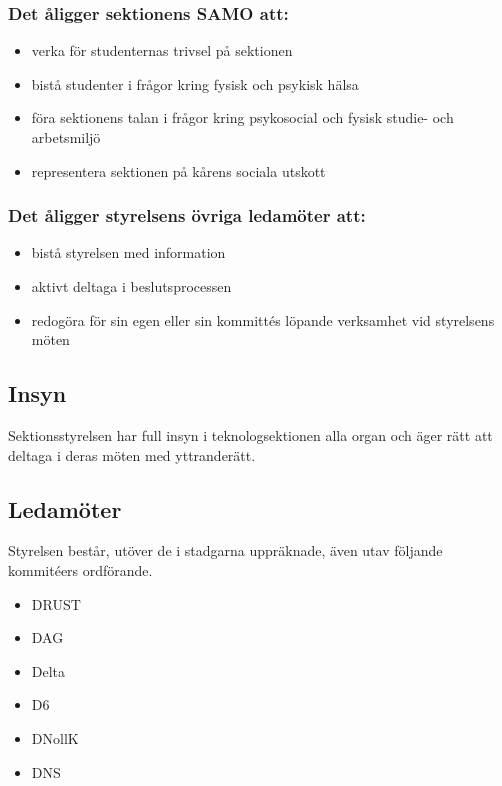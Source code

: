 \subsubsection{Det åligger sektionens SAMO att:}

\begin{itemize}
    \item verka för studenternas trivsel på sektionen
    \item bistå studenter i frågor kring fysisk och psykisk hälsa
    \item föra sektionens talan i frågor kring psykosocial och fysisk studie- och arbetsmiljö
    \item representera sektionen på kårens sociala utskott
\end{itemize}

\subsubsection{Det åligger styrelsens övriga ledamöter att:}

\begin{itemize}
  \item bistå styrelsen med information 
  \item aktivt deltaga i beslutsprocessen 
  \item redogöra för sin egen eller sin kommittés löpande verksamhet vid styrelsens möten 
\end{itemize}

\subsection{Insyn} 

Sektionsstyrelsen har full insyn i teknologsektionen alla organ och äger rätt att deltaga i deras möten med yttranderätt. 

\subsection{Ledamöter}
Styrelsen består, utöver de i stadgarna uppräknade, även utav följande kommitéers ordförande. 
\begin{itemize}
  \item DRUST 
  \item DAG 
  \item Delta 
  \item D6 
  \item DNollK
  \item DNS
\end{itemize}

